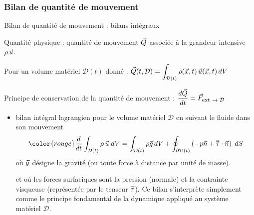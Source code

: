 \subsubsection{Bilan de quantité de mouvement}

\begin{frame}{Bilan de quantité de mouvement : bilans intégraux}

\small

Quantité physique : quantité de mouvement $\vec{Q}$ associée à la grandeur intensive 
$\rho \, \vec{u}$.

\medskip

Pour un volume matériel $\mathcal{D}(t)$ donné : 
$ \displaystyle
	\vec{Q}(t, \mathcal{D}) 
	= \int_{\mathcal{D}(t)} \rho(\vec{x}, t)\, \vec{u}(\vec{x}, t) \, dV
$

\pause

Principe de conservation de la quantité de mouvement : 
$\displaystyle \frac{d \vec{Q}}{dt} = \vec{F}_{\mbox{\footnotesize ext $\rightarrow \mathcal{D}$}}$

\smallskip

\begin{itemize}
\item
	bilan intégral lagrangien pour le volume matériel $\mathcal{D}$ en suivant le fluide
	dans son mouvement
	\begin{equation}
		\color{rouge}
		\ddt{} \int_{\mathcal{D}(t)} \rho \, \myvec{u} \; dV 
		=
		\int_{\mathcal{D}(t)} \rho \myvec{g} \, dV 
		+ \oint_{\partial \mathcal{D}(t)} 
		\left( -p \myvec{n} + \mytensor{\tau} \cdot \myvec{n}\right) \; dS
		\label{eq:bilan_global_lagrangien_qdm}
	\end{equation}
	où $\vec{g}$ désigne la gravité (ou toute force à distance par unité de masse).
	
	et où les forces surfaciques sont la pression (normale) et la contrainte visqueuse (représentée par le tenseur $\accentset{\Rightarrow}{\tau}$).
	Ce bilan s'interprète simplement comme le \textcolor{vert}{principe fondamental de la dynamique} 
	appliqué au système matériel $\mathcal{D}$.


\end{itemize}
\end{frame}
